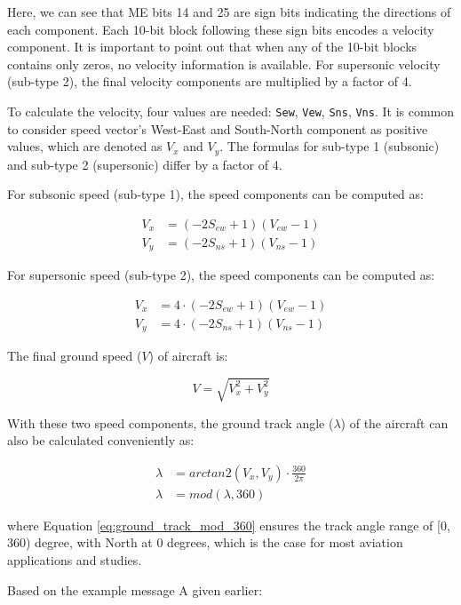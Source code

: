 Here, we can see that ME bits 14 and 25 are sign bits indicating the directions of each component. Each 10-bit block following these sign bits encodes a velocity component. It is important to point out that when any of the 10-bit blocks contains only zeros, no velocity information is available. For supersonic velocity (sub-type 2), the final velocity components are multiplied by a factor of 4.

To calculate the velocity, four values are needed: \texttt{Sew}, \texttt{Vew},  \texttt{Sns}, \texttt{Vns}. It is common to consider speed vector's West-East and South-North component as positive values, which are denoted as $V_x$ and $V_y$. The formulas for sub-type 1 (subsonic) and sub-type 2 (supersonic) differ by a factor of 4.

For subsonic speed (sub-type 1), the speed components can be computed as:

\begin{align}
  V_x &= (-2S_{ew} + 1) (V_{ew} - 1) \\
  V_y &= (-2S_{ns} + 1) (V_{ns} - 1)
\end{align}

For supersonic speed (sub-type 2), the speed components can be computed as:

\begin{align}
  V_x &= 4 \cdot (-2S_{ew} + 1) (V_{ew} - 1)\\
  V_y &= 4 \cdot (-2S_{ns} + 1) (V_{ns} - 1)
\end{align}


The final ground speed ($V$) of aircraft is:

\begin{equation}
  V = \sqrt{V_x^2 + V_y^2}
\end{equation}

With these two speed components, the ground track angle ($\lambda$) of the aircraft can also be calculated conveniently as:

\begin{align}
  \lambda &= arctan2 \left( V_x, V_y \right) \cdot \frac{360}{2\pi} \\
  \lambda &= mod(\lambda, 360) \label{eq:ground_track_mod_360}
\end{align}

where Equation \ref{eq:ground_track_mod_360} ensures the track angle range of [0, 360) degree, with North at 0 degrees, which is the case for most aviation applications and studies.

Based on the example message A given earlier:

